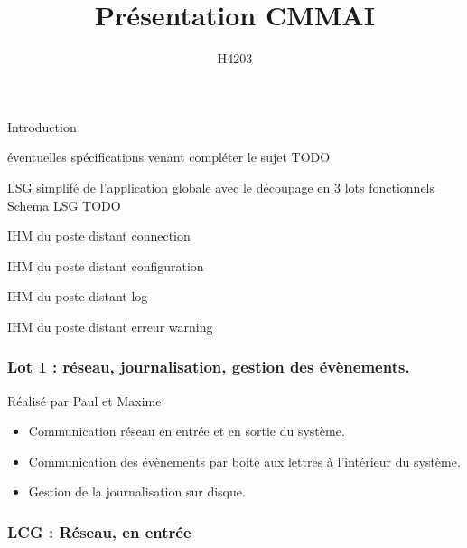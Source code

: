 \documentclass{beamer}
\title{Présentation CMMAI}
\author{H4203} %
\begin{document}
\begin{frame}
\titlepage
\end{frame}

\begin{frame}
Introduction
\end{frame}

\begin{frame}
éventuelles spécifications venant compléter le sujet
TODO
\end{frame}

\begin{frame}
LSG simplifé de l'application globale avec le découpage en 3 lots fonctionnels
Schema LSG TODO
\end{frame}

\begin{frame}
IHM du poste distant
connection
\end{frame}

\begin{frame}
IHM du poste distant
configuration
\end{frame}

\begin{frame}
IHM du poste distant
log
\end{frame}

\begin{frame}
IHM du poste distant
erreur \/ warning
\end{frame}

\begin{frame}
\frametitle{Lot 1 : réseau, journalisation, gestion des évènements.}
    \begin{block}{Réalisé par Paul et Maxime}
	\begin{itemize}
	    \item   Communication réseau en entrée et en sortie du système.
	    \item   Communication des évènements par boite aux lettres à
	    l'intérieur du système.
	    \item   Gestion de la journalisation sur disque.
	\end{itemize}
    \end{block}
\end{frame}

\begin{frame}

\end{frame}

\begin{frame}
    \frametitle{LCG : Réseau, en entrée}
     
\end{frame}
\end{document}
